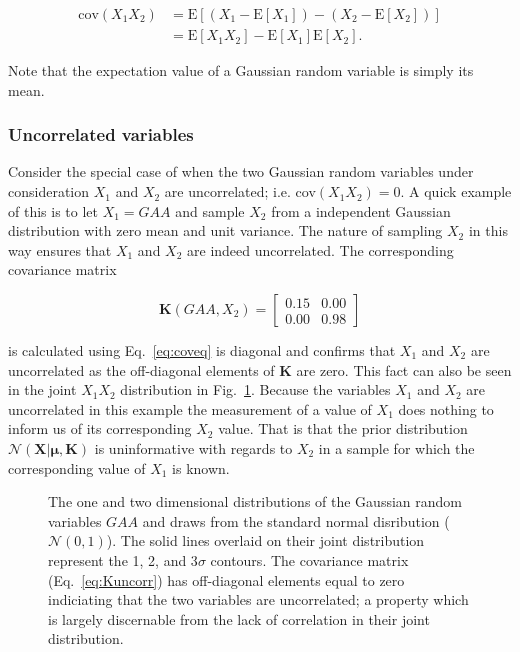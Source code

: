\begin{align}
  \text{cov}(X_1X_2) &= \text{E}[(X_1-\text{E}[X_1]) - (X_2-\text{E}[X_2])] \\
  &= \text{E}[X_1X_2] - \text{E}[X_1]\text{E}[X_2].
  \label{eq:coveq}
\end{align}

\noindent Note that the expectation value of a Gaussian random variable is simply
its mean. \\

\subsubsection{Uncorrelated variables}
Consider the special case of when the two Gaussian random variables under
consideration $X_1$ and $X_2$ are uncorrelated; i.e. cov$(X_1X_2)=0$. A quick
example of this is to let $X_1=GAA$ and sample $X_2$ from a independent Gaussian
distribution with zero mean and unit variance.
The nature of sampling $X_2$ in this way ensures
that $X_1$ and $X_2$ are indeed uncorrelated. The corresponding covariance matrix

\begin{equation}
  \mathbf{K}(GAA,X_2) =
  \begin{bmatrix}
    0.15 & 0.00 \\
    0.00 & 0.98
  \end{bmatrix}
  \label{eq:Kuncorr}
\end{equation}

\noindent is calculated using Eq.~\ref{eq:coveq} is diagonal and confirms that
$X_1$ and $X_2$ are uncorrelated as the off-diagonal elements of $\mathbf{K}$ are zero.
This fact can also be seen in the joint $X_1X_2$ distribution in Fig.~\ref{fig:uncorr2d}.
Because the variables $X_1$ and $X_2$ are uncorrelated in this example the
measurement of a value of $X_1$ does nothing to inform us of its corresponding
$X_2$ value. That is that the prior distribution
$\mathcal{N}(\mathbf{X}|\boldsymbol{\mu},\mathbf{K})$ is uninformative with regards to
$X_2$ in a sample for which the corresponding value of $X_1$ is known. \\

\begin{figure}
  \centering
  \caption[Uncorrelated Gaussian random variables in two dimensions.]
      {The one and two dimensional distributions of the Gaussian random
        variables $GAA$ and draws from the standard normal disribution ($\mathcal{N}(0,1)$).
        The solid
    lines overlaid on their joint distribution represent the 1, 2, and 3$\sigma$
    contours. The covariance matrix (Eq.~\ref{eq:Kuncorr}) has off-diagonal
    elements equal to zero indiciating that the two variables are uncorrelated;
    a property which is largely discernable from the lack of correlation in their joint
    distribution.}
  \label{fig:uncorr2d}
\end{figure}

